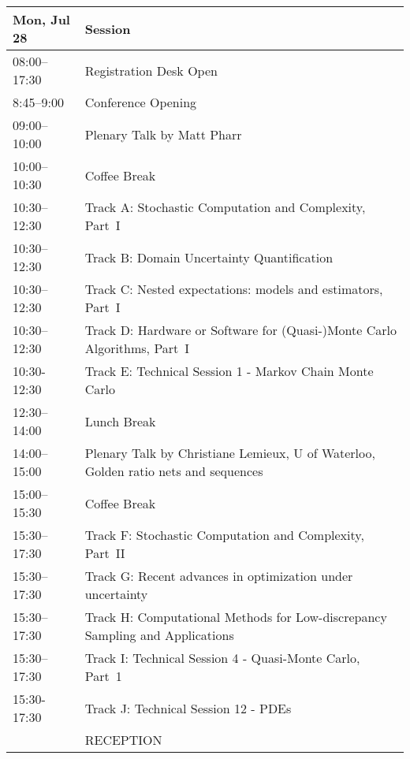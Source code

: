 \begin{table}
\begin{tabularx}{\textwidth}{>{\hsize=0.32\hsize}X|>{\hsize=1.7\hsize}X}
\hline
\textbf{Mon, Jul 28} & \textbf{Session} \\
\hline
\cellcolor{\EmptyColor}08:00–17:30 & \cellcolor{\EmptyColor}Registration Desk Open \\
\cellcolor{\EmptyColor}8:45–9:00 & \cellcolor{\EmptyColor}Conference Opening \\
\cellcolor{\PlenaryColor}09:00–10:00 & \cellcolor{\PlenaryColor}Plenary Talk by Matt Pharr \\
\cellcolor{\EmptyColor}10:00–10:30 & \cellcolor{\EmptyColor}Coffee Break \\
\cellcolor{\SessionTitleColor}10:30–12:30 & \cellcolor{\SessionTitleColor}Track A: Stochastic Computation and Complexity, Part~I \\
\cellcolor{\SessionTitleColor}10:30–12:30 & \cellcolor{\SessionTitleColor}Track B: Domain Uncertainty Quantification \\
\cellcolor{\SessionTitleColor}10:30–12:30 & \cellcolor{\SessionTitleColor}Track C: Nested expectations: models and estimators, Part~I \\
\cellcolor{\SessionTitleColor}10:30–12:30 & \cellcolor{\SessionTitleColor}Track D: Hardware or Software for (Quasi-)Monte Carlo Algorithms, Part~I \\
\cellcolor{\SessionLightColor}10:30-12:30 & \cellcolor{\SessionLightColor}Track E: Technical Session 1 - Markov Chain Monte Carlo \\
\cellcolor{\EmptyColor}12:30–14:00 & \cellcolor{\EmptyColor}Lunch Break \\
\cellcolor{\PlenaryColor}14:00–15:00 & \cellcolor{\PlenaryColor}Plenary Talk by Christiane Lemieux, U of Waterloo, Golden ratio nets and sequences \\
\cellcolor{\EmptyColor}15:00–15:30 & \cellcolor{\EmptyColor}Coffee Break \\
\cellcolor{\SessionTitleColor}15:30–17:30 & \cellcolor{\SessionTitleColor}Track F: Stochastic Computation and Complexity, Part~II \\
\cellcolor{\SessionTitleColor}15:30–17:30 & \cellcolor{\SessionTitleColor}Track G: Recent advances in optimization under uncertainty \\
\cellcolor{\SessionTitleColor}15:30–17:30 & \cellcolor{\SessionTitleColor}Track H: Computational Methods for Low-discrepancy Sampling and Applications \\
\cellcolor{\SessionLightColor}15:30–17:30 & \cellcolor{\SessionLightColor}Track I: Technical Session 4 - Quasi-Monte Carlo, Part~1 \\
\cellcolor{\SessionLightColor}15:30-17:30 & \cellcolor{\SessionLightColor}Track J: Technical Session 12 - PDEs \\
\cellcolor{\EmptyColor} & \cellcolor{\EmptyColor}RECEPTION \\
\hline
\end{tabularx}
\end{table}

